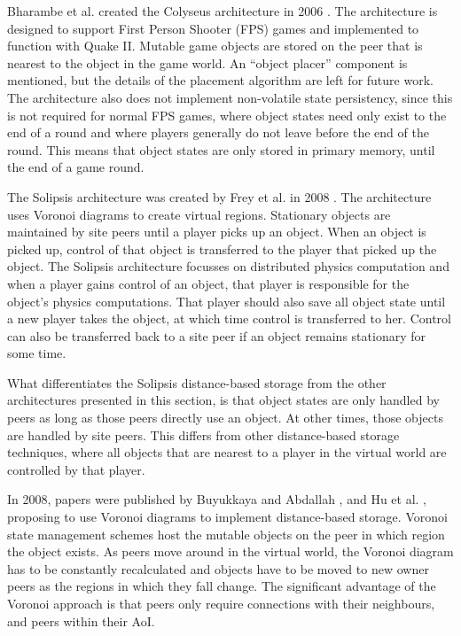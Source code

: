 Bharambe et al. created the Colyseus architecture in 2006 \cite{colyseus_distance_based}. The architecture is designed to support First Person Shooter (FPS) games and implemented to function with Quake II. Mutable game objects are stored on the peer that is nearest to the object in the game world. An ``object placer'' component is mentioned, but the details of the placement algorithm are left for future work. The architecture also does not implement non-volatile state persistency, since this is not required for normal FPS games, where object states need only exist to the end of a
round and where players generally do not leave before the end of the round. This means that object states are only stored in primary memory, until the end of a game round.

The Solipsis architecture was created by Frey et al. in 2008 \cite{solipsis}. The architecture uses Voronoi diagrams to create virtual regions. Stationary objects are maintained by site peers until a player picks up an object. When an object is picked up, control of that object is transferred to the player that picked up the object. The Solipsis architecture focusses on distributed physics computation and when a player gains control of an object, that player is responsible for the object's physics computations. That player should also save all object state until a new player takes the object, at which time control is transferred to her. Control can also be transferred back to a site peer if an object remains stationary for some
time.

What differentiates the Solipsis distance-based storage from the other architectures presented in this section, is that object states are only handled by peers as long as those peers directly use an object. At other times, those objects are handled by site peers. This differs from other distance-based storage techniques, where all objects that are nearest to a player in the virtual world are controlled by that player.

In 2008, papers were published by Buyukkaya and Abdallah \cite{Buyukkaya_voronoi_state_management}, and Hu et al. \cite{Hu_voronoi_IM}, proposing to use Voronoi diagrams \cite{voronoi_diagrams_survey} to implement distance-based storage. Voronoi state management schemes host the mutable objects on the peer in which region the object exists. As peers move around in the virtual world, the Voronoi diagram has to be constantly recalculated and objects have to be moved to new owner peers as the regions in which they fall change. The significant advantage of the Voronoi approach is that peers only require connections with their neighbours, and peers within their AoI.

